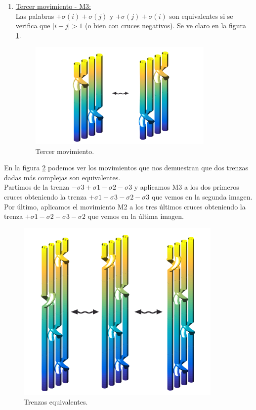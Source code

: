 \documentclass[14pt]{extarticle}
\begin{document}
\begin{enumerate}
		
		\item \underline{Tercer movimiento - M3:} \\
		Las palabras $+\sigma(i) +\sigma(j)$ y $+\sigma(j) +\sigma(i)$ son equivalentes si se verifica que $|i-j| > 1$ (o bien con cruces negativos). Se ve claro en la figura \ref{tren8}.
		\begin{figure}[h!]
			\centering
			\includegraphics[width=9cm]{itrenzas/M3.png}
			\caption{Tercer movimiento.}
			\label{tren8} 
		\end{figure}
		
	\end{enumerate}
	En la figura \ref{tren9} podemos ver los movimientos que nos demuestran que dos trenzas dadas más complejas son equivalentes. \\
	Partimos de la trenza $-\sigma3+\sigma1-\sigma2-\sigma3$ y aplicamos M3 a los dos primeros cruces obteniendo la trenza $+\sigma1-\sigma3-\sigma2-\sigma3$ que vemos en la segunda imagen. \\
	Por último, aplicamos el movimiento M2 a los tres últimos cruces obteniendo la trenza $+\sigma1-\sigma2-\sigma3-\sigma2$ que vemos en la última imagen.\\
	\begin{figure}[h!]
		\centering
		\includegraphics[width=10cm]{itrenzas/movi.png}
		\caption{Trenzas equivalentes.}
		\label{tren9} 
	\end{figure}
	
\end{document}
